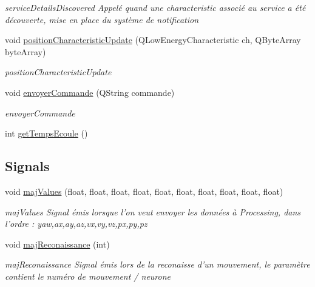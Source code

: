 \begin{DoxyCompactItemize}
\begin{DoxyCompactList}\small\item\em service\-Details\-Discovered Appelé quand une characteristic associé au service a été découverte, mise en place du système de notification \end{DoxyCompactList}\item 
void \hyperlink{classDevice_aab4bfb4bd87c6f38a46c88e85248978d}{position\-Characteristic\-Update} (Q\-Low\-Energy\-Characteristic ch, Q\-Byte\-Array byte\-Array)
\begin{DoxyCompactList}\small\item\em position\-Characteristic\-Update \end{DoxyCompactList}\item 
void \hyperlink{classDevice_a117df211456a907881351f34d668c272}{envoyer\-Commande} (Q\-String commande)
\begin{DoxyCompactList}\small\item\em envoyer\-Commande \end{DoxyCompactList}\item 
int \hyperlink{classDevice_aeba9db522dae3a0b46314c9ecd4bccb8}{get\-Temps\-Ecoule} ()
\end{DoxyCompactItemize}
\subsection*{Signals}
\begin{DoxyCompactItemize}
\item 
\hypertarget{classDevice_a4a90c926fc9b522a38ee0d2fdf4568a9}{void \hyperlink{classDevice_a4a90c926fc9b522a38ee0d2fdf4568a9}{maj\-Values} (float, float, float, float, float, float, float, float, float, float)}\label{classDevice_a4a90c926fc9b522a38ee0d2fdf4568a9}

\begin{DoxyCompactList}\small\item\em maj\-Values Signal émis lorsque l'on veut envoyer les données à Processing, dans l'ordre \-: yaw,ax,ay,az,vx,vy,vz,px,py,pz \end{DoxyCompactList}\item 
\hypertarget{classDevice_a6d7cf166a67336a048ddc945a9bbc7c9}{void \hyperlink{classDevice_a6d7cf166a67336a048ddc945a9bbc7c9}{maj\-Reconaissance} (int)}\label{classDevice_a6d7cf166a67336a048ddc945a9bbc7c9}

\begin{DoxyCompactList}\small\item\em maj\-Reconaissance Signal émis lors de la reconaisse d'un mouvement, le paramètre contient le numéro de mouvement / neurone \end{DoxyCompactList}\end{DoxyCompactItemize}
